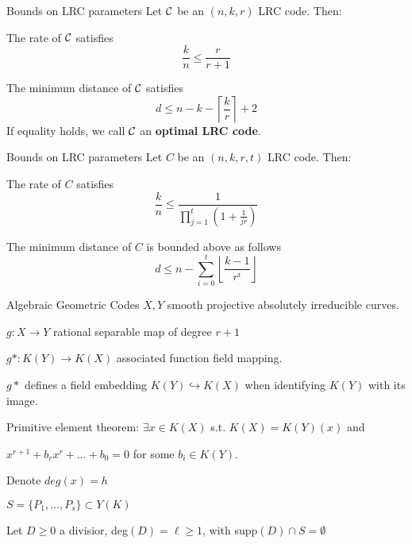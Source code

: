 \begin{frame}{Bounds on LRC parameters}
	Let $\mathcal{C}$ be an $(n,k,r)$ LRC code. Then:
    \begin{thm}
        The rate of $\mathcal{C}$ satisfies
        $$ \frac{k}{n} \leq \frac{r}{r+1} $$
    \end{thm}
    
    \begin{thm}
        The minimum distance of $\mathcal{C}$ satisfies
            $$d \leq n - k - \left\lceil \frac{k}{r} \right\rceil + 2$$
        If equality holds, we call $\mathcal{C}$ an \textbf{optimal LRC code}.
    \end{thm}
\end{frame}

\begin{frame}{Bounds on LRC parameters}
    Let $C$ be an $(n,k,r,t)$ LRC code. Then:
    \begin{thm}
        \label{thm:max_rate_t}
        The rate of $C$ satisfies
        $$ \frac{k}{n} \leq \frac{1}{\prod_{j=1}^{t} (1 + \frac{1}{jr} )} $$
    \end{thm}
    
    \begin{thm}
        \label{thm:min_dist_t}
        The minimum distance of $C$ is bounded above as follows
        $$ d \leq n - \sum_{i=0}^{t} \left\lfloor \frac{k-1}{r^i} \right\rfloor $$
    \end{thm}
\end{frame}   

\begin{frame}{Algebraic Geometric Codes}
$X,Y$ smooth projective absolutely irreducible curves.

$g: X \rightarrow Y$ rational separable map of degree $r+1$

$g*: K(Y) \rightarrow K(X)$ associated function field mapping.

$g*$ defines a field embedding $K(Y) \hookrightarrow K(X)$ when identifying $K(Y)$ with its image.

Primitive element theorem: $\exists x \in K(X)$ s.t. $K(X) = K(Y)(x)$  and

$x^{r+1} + b_r x^r + ... + b_0 = 0$ for some $b_i \in K(Y)$.

Denote $deg(x) = h$

$S = \{ P_1, ..., P_s \} \subset Y(K)$

Let $D \geq 0$ a divisior, deg$(D) = \ell \geq 1$, with supp$(D) \cap S = \emptyset$
\end{frame}

